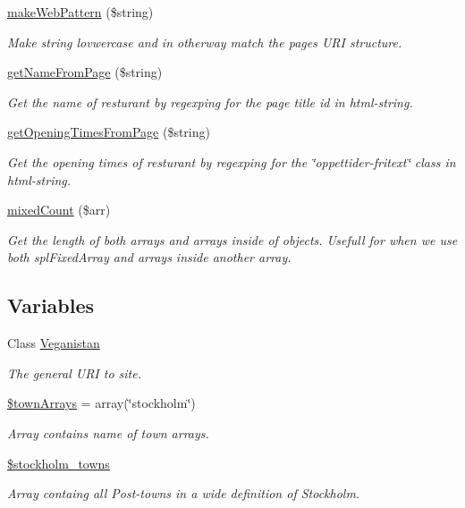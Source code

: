\begin{DoxyCompactItemize}
\hyperlink{veganistan_8php_a7f0c7d546fe1fc26d7ba1e8b58bb7cde}{make\+Web\+Pattern} (\$string)
\begin{DoxyCompactList}\small\item\em Make string lovwercase and in otherway match the pages U\+R\+I structure. \end{DoxyCompactList}\item 
\hyperlink{veganistan_8php_ab4235042caee848a173cb153da0f29be}{get\+Name\+From\+Page} (\$string)
\begin{DoxyCompactList}\small\item\em Get the name of resturant by regexping for the page title id in html-\/string. \end{DoxyCompactList}\item 
\hyperlink{veganistan_8php_a96e15e817a7a149db3e0b45ce0067e13}{get\+Opening\+Times\+From\+Page} (\$string)
\begin{DoxyCompactList}\small\item\em Get the opening times of resturant by regexping for the \char`\"{}oppettider-\/fritext\char`\"{} class in html-\/string. \end{DoxyCompactList}\item 
\hyperlink{veganistan_8php_a3efb5bb55d51db5839c3e83b0f490c75}{mixed\+Count} (\$arr)
\begin{DoxyCompactList}\small\item\em Get the length of both arrays and arrays inside of objects. Usefull for when we use both spl\+Fixed\+Array and arrays inside another array. \end{DoxyCompactList}\end{DoxyCompactItemize}
\subsection*{Variables}
\begin{DoxyCompactItemize}
\item 
Class \hyperlink{veganistan_8php_ad195a0ca83dc2cfc81667f8b7e2c2e8f}{Veganistan}
\begin{DoxyCompactList}\small\item\em The general U\+R\+I to site. \end{DoxyCompactList}\item 
\hyperlink{veganistan_8php_a91710d77c3b1fe716933e6b2812ebb48}{\$town\+Arrays} = array(\char`\"{}stockholm\char`\"{})
\begin{DoxyCompactList}\small\item\em Array contains name of town arrays. \end{DoxyCompactList}\item 
\hyperlink{veganistan_8php_aa87fd4a07e43c737def4add38fe29880}{\$stockholm\+\_\+towns}
\begin{DoxyCompactList}\small\item\em Array containg all Post-\/towns in a wide definition of Stockholm. \end{DoxyCompactList}\end{DoxyCompactItemize}


